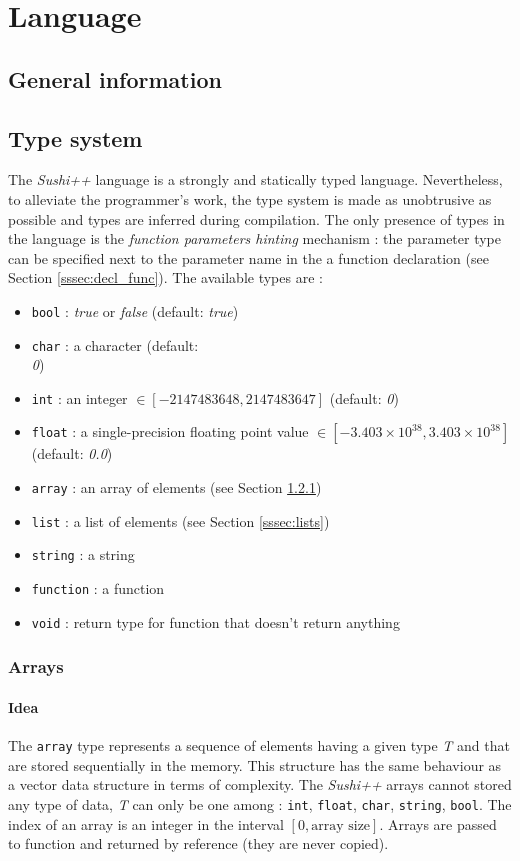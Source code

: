 \documentclass[a4paper,11pt]{article}
\begin{document}
\section{Language}
\label{sec:language}
\subsection{General information}
\subsection{Type system}
\label{ssec:types_s}
The \textit{Sushi++} language is a strongly and statically typed language. Nevertheless, to alleviate the programmer's work, the type system is made as unobtrusive as possible and types are inferred during compilation. The only presence of types in the language is the \textit{function parameters hinting} mechanism : the parameter type can be specified next to the parameter name in the a function declaration (see Section \ref{sssec:decl_func}). The available types are :

\begin{itemize}
	\item \texttt{bool} : \textit{true} or \textit{false} (default: \textit{true})
	\item \texttt{char} : a character (default: \textit{\\0})
	\item \texttt{int} : an integer $\in [-2147483648, 2147483647]$ (default: \textit{0})
	\item \texttt{float} : a single-precision floating point value $\in [-3.403 \times 10^{38},  3.403 \times 10^{38}] $ (default: \textit{0.0})
	\item \texttt{array} : an array of elements (see Section \ref{sssec:arrays})
	\item \texttt{list} : a list of elements (see Section \ref{sssec:lists})
	\item \texttt{string} : a string
	\item \texttt{function} : a function
	\item \texttt{void} : return type for function that doesn't return anything
\end{itemize}
\subsubsection{Arrays}
\label{sssec:arrays}
\paragraph{Idea}
The \texttt{array} type represents a sequence of elements having a given type \textit{T} and that are stored sequentially in the memory. This structure has the same behaviour as a vector data structure in terms of complexity. The \textit{Sushi++} arrays cannot stored any type of data, \textit{T} can only be one among : \texttt{int}, \texttt{float}, \texttt{char}, \texttt{string}, \texttt{bool}. The index of an array is an integer in the interval $[0, \text{array size}]$. Arrays are passed to function and returned by reference (they are never copied).
\end{document}
